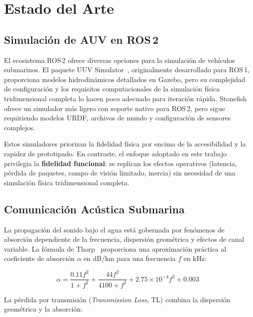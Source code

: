 \documentclass[10pt,twocolumn,letterpaper]{article}
\begin{document}
\section{Estado del Arte}
\label{sec:estado_arte}

\subsection{Simulación de AUV en ROS\,2}

El ecosistema ROS\,2 ofrece diversas opciones para la simulación de vehículos submarinos. El paquete UUV Simulator~\cite{uuvsim2016}, originalmente desarrollado para ROS\,1, proporciona modelos hidrodinámicos detallados en Gazebo, pero su complejidad de configuración y los requisitos computacionales de la simulación física tridimensional completa lo hacen poco adecuado para iteración rápida. Stonefish~\cite{stonefish2020} ofrece un simulador más ligero con soporte nativo para ROS\,2, pero sigue requiriendo modelos URDF, archivos de mundo y configuración de sensores complejos.

Estos simuladores priorizan la fidelidad física por encima de la accesibilidad y la rapidez de prototipado. En contraste, el enfoque adoptado en este trabajo privilegia la \textbf{fidelidad funcional}: se replican los efectos operativos (latencia, pérdida de paquetes, campo de visión limitado, inercia) sin necesidad de una simulación física tridimensional completa.

\subsection{Comunicación Acústica Submarina}

La propagación del sonido bajo el agua está gobernada por fenómenos de absorción dependiente de la frecuencia, dispersión geométrica y efectos de canal variable. La fórmula de Thorp~\cite{thorp1967} proporciona una aproximación práctica al coeficiente de absorción $\alpha$ en dB/km para una frecuencia $f$ en kHz:

\begin{equation}
\alpha = \frac{0.11 f^2}{1 + f^2} + \frac{44 f^2}{4100 + f^2} + 2.75 \times 10^{-4} f^2 + 0.003
\label{eq:thorp}
\end{equation}

La pérdida por transmisión (\textit{Transmission Loss}, TL) combina la dispersión geométrica y la absorción:
\end{document}
